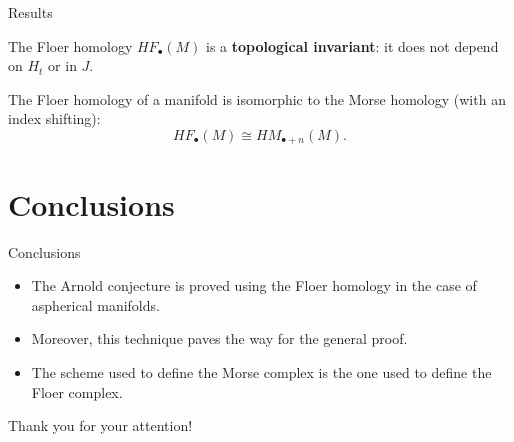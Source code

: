 \documentclass{beamer}
\newcommand{\con}[1]{\mathbb{#1}}
\newcommand{\R}{\con{R}}
\begin{document}

%

\begin{frame}{Results}
	\begin{theorem}
		The Floer homology $HF_{\bullet}(M)$ is a {\bf topological invariant}: it does not depend on $H_t$ or in $J$.
	\end{theorem}

	\begin{theorem}
		The Floer homology of a manifold is isomorphic to the Morse homology (with an index shifting):
		\[HF_{\bullet}(M) \cong HM_{\bullet+n}(M) .\]
	\end{theorem}
\end{frame}

\section{Conclusions}

\begin{frame}{Conclusions}
	\begin{itemize}
		\item The Arnold conjecture is proved using the Floer homology in the case of aspherical manifolds.
		\item Moreover, this technique paves the way for the general proof.
		\item The scheme used to define the Morse complex is the one used to define the Floer complex.
	\end{itemize}
\end{frame}

\begin{frame}
	\begin{center}
		\huge Thank you for your attention!
	\end{center}
\end{frame}
\end{document}
